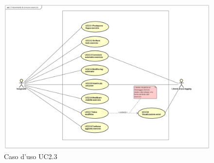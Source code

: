 


\begin{figure}[H]
	\centering
	\includegraphics[width=18cm]{img/UC23.png} 
	\caption{Caso d'uso UC2.3}
\end{figure}


